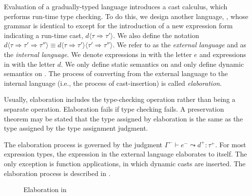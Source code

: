 Evaluation of a gradually-typed language introduces a cast calculus, which performs run-time type checking. To do this, we design another language, \gtclc{}, whose grammar is identical to \gtlc{} except for the introduction of a new expression form indicating a run-time cast, $d\langle\tau\Rightarrow\tau'\rangle$. We also define the notation $d\langle\tau\Rightarrow\tau'\Rightarrow\tau''\rangle\equiv d\langle\tau\Rightarrow\tau'\rangle\langle\tau'\Rightarrow\tau''\rangle$. We refer to \gtlc{} as the \textit{external language} and \gtclc{} as the \textit{internal language}. We denote expressions in \gtlc{} with the letter $e$ and expressions in \gtclc{} with the letter $d$. We only define static semantics on \gtlc{} and only define dynamic semantics on \gtclc{}. The process of converting from the external language to the internal language (i.e., the process of cast-insertion) is called \textit{elaboration}.

Usually, elaboration includes the type-checking operation rather than being a separate operation. Elaboration fails if type checking fails. A preservation theorem may be stated that the type assigned by elaboration is the same as the type assigned by the type assignment judgment.

The elaboration process is governed by the judgment $\Gamma^-\vdash e^-\leadsto d^+:\tau^+$. For most expression types, the expression in the external language elaborates to itself. The only exception is function applications, in which dynamic casts are inserted. The elaboration process is described in .

\begin{figure}
  \centering
  \begin{mdframed}
    \begin{singlespace}
    \end{singlespace}
  \end{mdframed}
  \caption{Elaboration in \gtlc}
  \label{fig:elaboration-gtlc}
\end{figure}

